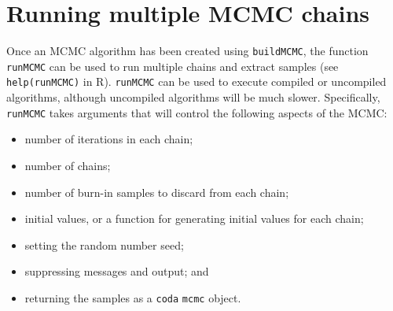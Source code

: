 \documentclass[12pt,oneside]{book}\usepackage[]{graphicx}\usepackage[]{color}
\def\cd#1{\texttt{#1}}
\begin{document}
\section{Running multiple MCMC chains}
\label{sec:runMCMC}

Once an MCMC algorithm has been created using \cd{buildMCMC}, the function \cd{runMCMC} can be used to run multiple chains and extract samples (see \cd{help(runMCMC)} in R).   \cd{runMCMC} can be used to execute compiled or uncompiled algorithms, although uncompiled algorithms will be much slower.  Specifically, \cd{runMCMC} takes arguments that will control the following aspects of the MCMC:


\begin{itemize}
\item number of iterations in each chain;
\item number of chains;
\item number of burn-in samples to discard from each chain;
\item initial values, or a function for generating initial values for each chain;
\item setting the random number seed;
\item suppressing messages and output; and
\item returning the samples as a \cd{coda} \cd{mcmc} object.
\end{itemize}



\end{document}
